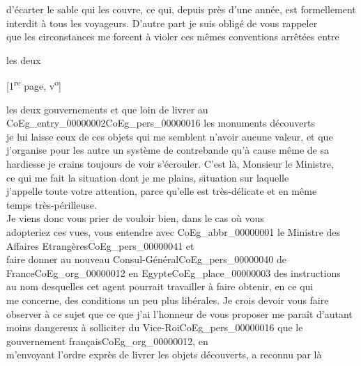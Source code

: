 \documentclass{book}
\begin{document}
d’écarter le sable qui les couvre, ce qui, depuis près d’une année, est formellement\\
interdit à tous les voyageurs. D’autre part je suis obligé de vous rappeler\\
que les circonstances me forcent à violer ces mêmes conventions arrêtées entre\\
\begin{flushright}les deux\end{flushright}
 {\footnotesize \begin{center} {[1\textsuperscript{re} page, v\textsuperscript{o}]}\end{center}}
les deux gouvernements et que loin de livrer au \gls{CoEg_entry_00000002}\gls{CoEg_pers_00000016} les monuments découverts\\
je lui laisse ceux de ces objets qui me semblent n’avoir aucune valeur, et que\\
j’organise pour les autre un système de contrebande qu’à cause même de sa\\
hardiesse je crains toujours de voir s’écrouler. C’est là, Monsieur le Ministre,\\
ce qui me fait la situation dont je me plains, situation sur laquelle\\
j’appelle toute votre attention, parce qu’elle est très-délicate et en même\\
temps très-périlleuse.\\
\indent Je viens donc vous prier de vouloir bien, dans le cas où vous\\
adopteriez ces vues, vous entendre avec \gls{CoEg_abbr_00000001} le Ministre des Affaires Etrangères\gls{CoEg_pers_00000041} et\\
faire donner au nouveau Consul-Général\gls{CoEg_pers_00000040} de France\gls{CoEg_org_00000012} en Egypte\gls{CoEg_place_00000003} des instructions\\
au nom desquelles cet agent pourrait travailler à faire obtenir, en ce qui\\
me concerne, des conditions un peu plus libérales. Je crois devoir vous faire\\
observer à ce sujet que ce que j’ai l’honneur de vous proposer me paraît d’autant\\
moins dangereux à solliciter du Vice-Roi\gls{CoEg_pers_00000016} que le gouvernement français\gls{CoEg_org_00000012}, en\\
m’envoyant l’ordre exprès de livrer les objets découverts, a reconnu par là\\
\end{document}

